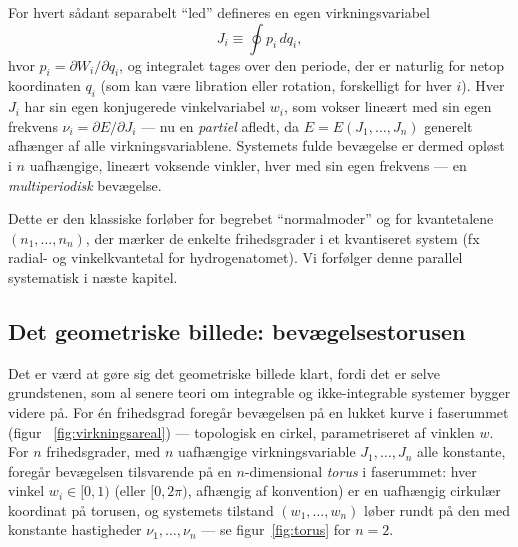 For hvert sådant separabelt ``led'' defineres en egen virkningsvariabel
\begin{equation}
  J_i \equiv \oint p_i\,dq_i,
\end{equation}
hvor $p_i=\partial W_i/\partial q_i$, og integralet tages over den
periode, der er naturlig for netop koordinaten $q_i$ (som kan være
libration eller rotation, forskelligt for hver $i$). Hver $J_i$ har sin
egen konjugerede vinkelvariabel $w_i$, som vokser lineært med sin egen
frekvens $\nu_i=\partial E/\partial J_i$ — nu en \emph{partiel}
afledt, da $E=E(J_1,\dots,J_n)$ generelt afhænger af alle
virkningsvariablene. Systemets fulde bevægelse er dermed opløst i $n$
uafhængige, lineært voksende vinkler, hver med sin egen frekvens — en
\emph{multiperiodisk} bevægelse.

\begin{bemaerkning}
Dette er den klassiske forløber for begrebet ``normalmoder'' og for
kvantetalene $(n_1,\dots,n_n)$, der mærker de enkelte frihedsgrader i
et kvantiseret system (fx radial- og vinkelkvantetal for
hydrogenatomet). Vi forfølger denne parallel systematisk i næste
kapitel.
\end{bemaerkning}

\subsection{Det geometriske billede: bevægelsestorusen}

Det er værd at gøre sig det geometriske billede klart, fordi det er
selve grundstenen, som al senere teori om integrable og
ikke-integrable systemer bygger videre på. For \'en frihedsgrad
foregår bevægelsen på en lukket kurve i faserummet (figur~
\ref{fig:virkningsareal}) — topologisk en cirkel, parametriseret af
vinklen $w$. For $n$ frihedsgrader, med $n$ uafhængige
virkningsvariable $J_1,\dots,J_n$ alle konstante, foregår bevægelsen
tilsvarende på en $n$-dimensional \emph{torus} i faserummet: hver
vinkel $w_i\in[0,1)$ (eller $[0,2\pi)$, afhængig af konvention) er en
uafhængig cirkulær koordinat på torusen, og systemets tilstand
$(w_1,\dots,w_n)$ løber rundt på den med konstante hastigheder
$\nu_1,\dots,\nu_n$ — se figur~\ref{fig:torus} for $n=2$.

